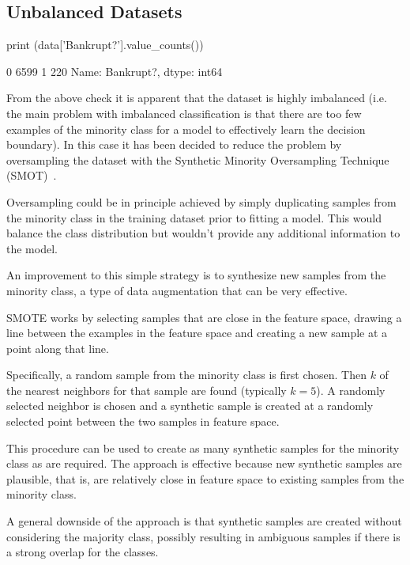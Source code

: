 \subsection{Unbalanced Datasets}

\begin{ipython}
print (data['Bankrupt?'].value_counts())
\end{ipython}
\begin{ioutput}
0    6599
1     220
Name: Bankrupt?, dtype: int64
\end{ioutput}

From the above check it is apparent that the dataset is highly imbalanced (i.e. the main problem with imbalanced classification is that there are too few examples of the minority class for a model to effectively learn the decision boundary). In this case it has been decided to reduce the problem by oversampling the dataset with the Synthetic Minority Oversampling Technique (SMOT)~\cite{bib:smot}. 

\begin{attention}
Oversampling could be in principle achieved by simply duplicating samples from the minority class in the training dataset prior to fitting a model. This would balance the class distribution but wouldn't provide any additional information to the model.

An improvement to this simple strategy is to synthesize new samples from the minority class, a type of data augmentation that can be very effective.

SMOTE works by selecting samples that are close in the feature space, drawing a line between the examples in the feature space and creating a new sample at a point along that line.

Specifically, a random sample from the minority class is first chosen. Then $k$ of the nearest neighbors for that sample are found (typically $k=5$). A randomly selected neighbor is chosen and a synthetic sample is created at a randomly selected point between the two samples in feature space.
\end{attention}

This procedure can be used to create as many synthetic samples for the minority class as are required. 
The approach is effective because new synthetic samples are plausible, that is, are relatively close in feature space to existing samples from the minority class.

A general downside of the approach is that synthetic samples are created without considering the majority class, possibly resulting in ambiguous samples if there is a strong overlap for the classes.

